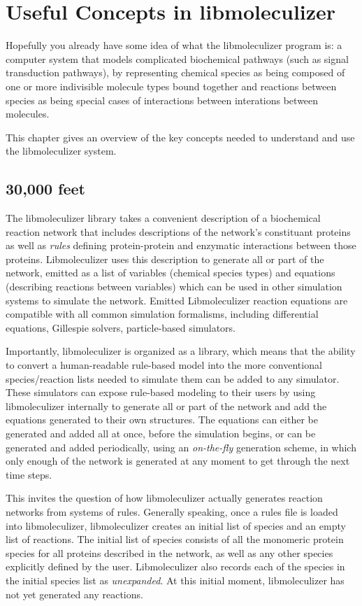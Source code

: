 \chapter{Useful Concepts in libmoleculizer}
\label{chap:conceptualOverviewChapter}

Hopefully you already have some idea of what the libmoleculizer
program is: a computer system that models complicated biochemical
pathways (such as signal transduction pathways), by representing chemical
species as being composed of one or more indivisible molecule types
bound together and reactions between species as being special cases of
interactions between interations between molecules.  

This chapter gives an overview of the key concepts needed to
understand and use the libmoleculizer system.  

\section{30,000 feet}

The libmoleculizer library takes a convenient description of a
biochemical reaction network that includes descriptions of the
network's constituant proteins as well as {\it rules} defining
protein-protein and enzymatic interactions between those proteins.
Libmoleculizer uses this description to generate all or part of the
network, emitted as a list of variables (chemical species types) and
equations (describing reactions between variables) which can be used
in other simulation systems to simulate the network.  Emitted
Libmoleculizer reaction equations are compatible with all common
simulation formalisms, including differential equations, Gillespie
solvers, particle-based simulators.

Importantly, libmoleculizer is organized as a library, which means
that the ability to convert a human-readable rule-based model into the
more conventional species/reaction lists needed to simulate them can
be added to any simulator.  These simulators can expose rule-based
modeling to their users by using libmoleculizer internally to generate
all or part of the network and add the equations generated to their own
structures.  The equations can either be generated and added all at
once, before the simulation begins, or can be generated and added
periodically, using an {\it on-the-fly} generation scheme, in which
only enough of the network is generated at any moment to get through
the next time steps.

This invites the question of how libmoleculizer actually
generates reaction networks from systems of rules. Generally speaking,
once a rules file is loaded into libmoleculizer, libmoleculizer
creates an initial list of species and an empty list of reactions.
The initial list of species consists of all the monomeric protein
species for all proteins described in the network, as well as any
other species explicitly defined by the user.  Libmoleculizer also
records each of the species in the initial species list as {\it
  unexpanded}.  At this initial moment, libmoleculizer has not yet
generated any reactions.

